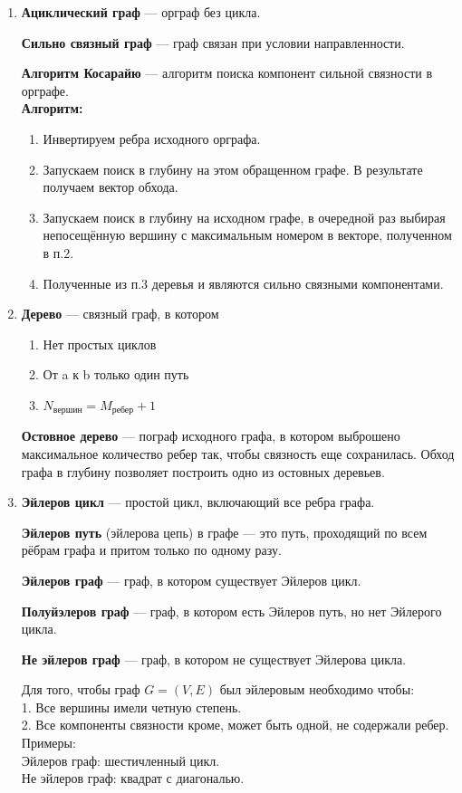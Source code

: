 \documentclass[a4paper,12pt]{article}
\theoremstyle{plain} %
\theoremstyle{definition} %
\theoremstyle{remark} %
\newcounter{num}
\begin{document}
\begin{enumerate}
\item \textbf{Ациклический граф} --- орграф без цикла.

\textbf{Сильно связный граф} --- граф связан при условии направленности.

\textbf{Алгоритм Косарайю} --- алгоритм поиска компонент сильной связности в орграфе.\\
\textbf{Алгоритм:}
\begin{enumerate}
	\item Инвертируем ребра исходного орграфа.
	\item Запускаем поиск в глубину на этом обращенном графе. В результате получаем вектор обхода.
	\item Запускаем поиск в глубину на исходном графе, в очередной раз выбирая непосещённую вершину с максимальным номером в векторе, полученном в п.2.
	\item Полученные из п.3 деревья и являются сильно связными компонентами.
\end{enumerate}

\item \textbf{Дерево} --- связный граф, в котором
\begin{enumerate}
	\item Нет простых циклов
	\item От a к b только один путь
	\item $N_{\text{вершин}}=M_{\text{ребер}}+1$
\end{enumerate}
\textbf{Остовное дерево} --- пограф исходного графа, в котором выброшено максимальное количество ребер так, чтобы связность еще сохранилась. Обход графа в глубину позволяет построить одно из остовных деревьев.

\item \textbf{Эйлеров цикл} --- простой цикл, включающий все ребра графа.

\textbf{Эйлеров путь} (эйлерова цепь) в графе --- это путь, проходящий по всем рёбрам графа и притом только по одному разу.

\textbf{Эйлеров граф} --- граф, в котором существует Эйлеров цикл.

\textbf{Полуйэлеров граф} --- граф, в котором есть Эйлеров путь, но нет Эйлерого цикла.

\textbf{Не эйлеров граф} --- граф, в котором не существует Эйлерова цикла.

Для того, чтобы граф $G = (V, E)$ был эйлеровым необходимо чтобы:\\
1. Все вершины имели четную степень.\\
2. Все компоненты связности кроме, может быть одной, не содержали ребер.\\
Примеры:\\
Эйлеров граф: шестичленный цикл.\\
Не эйлеров граф: квадрат с диагональю.\\


\end{enumerate}
\end{document}
